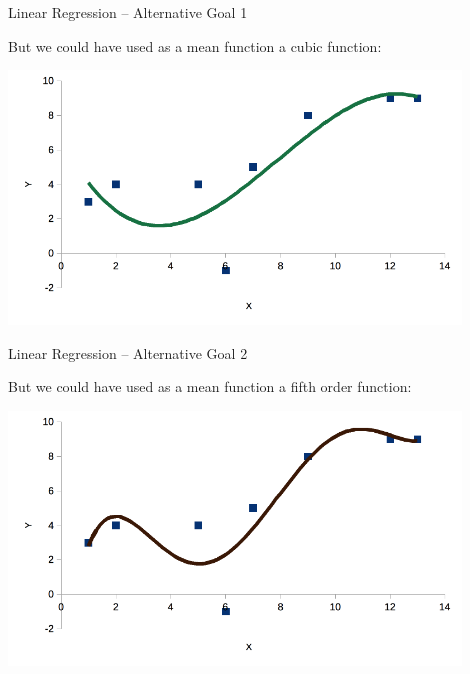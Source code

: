 \documentclass{beamer}
\begin{document}
\begin{frame}
{\centerline{Linear Regression -- Alternative Goal 1}}

But we could have used as a mean function a cubic function:

\begin{center}
\includegraphics[width=12cm]{A2022.IDSEPC.RegressioneLineare/LinearRegression_Degree3.png}
\end{center}

\end{frame}

\begin{frame}
{\centerline{Linear Regression -- Alternative Goal 2}}

But we could have used as a mean function a fifth order function:

\begin{center}
\includegraphics[width=12cm]{A2022.IDSEPC.RegressioneLineare/LinearRegression_Degree5.png}
\end{center}

\end{frame}
\end{document}
